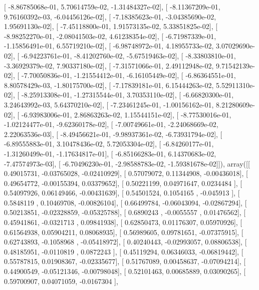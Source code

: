 \documentclass{article}
\begin{document}
       [ -8.86785068e-01,   5.70614759e-02,  -1.31484327e-02],
       [ -8.11367209e-01,   9.76160392e-03,  -6.04456126e-02],
       [ -7.18385623e-01,  -3.04385690e-02,   1.95691130e-02],
       [ -7.45118800e-01,   1.91573135e-02,   5.33851825e-02],
       [ -8.98252270e-01,  -2.08041503e-02,   4.61238354e-02],
       [ -6.71987339e-01,  -1.15856491e-01,   6.55719210e-02],
       [ -6.98748972e-01,   4.18955733e-02,   3.07029690e-02],
       [ -6.94223761e-01,  -8.41202760e-02,  -5.67519463e-02],
       [ -8.33803810e-01,  -3.36929379e-02,   7.90337180e-02],
       [ -7.31571066e-01,   2.49112948e-02,   9.71542139e-02],
       [ -7.70050836e-01,  -1.21554412e-01,  -6.16105449e-02],
       [ -6.86364551e-01,   8.80578429e-03,  -1.80175700e-02],
       [ -7.17839181e-01,   6.15444263e-02,   5.52911310e-02],
       [ -8.25913308e-01,  -1.27315544e-01,   3.70353110e-02],
       [ -6.66820300e-01,   3.24643992e-03,   5.64370210e-02],
       [ -7.23461245e-01,  -1.00156162e-01,   8.21280609e-02],
       [ -6.93983006e-01,   2.86863263e-02,   1.15544151e-02],
       [ -8.77530016e-01,  -1.02124477e-01,  -9.62360178e-02],
       [ -7.00749661e-01,  -2.24068669e-02,   2.22063536e-03],
       [ -8.49456621e-01,  -9.98937361e-02,  -6.73931794e-02],
       [ -6.89555883e-01,   3.10478436e-02,   5.72053304e-02],
       [ -6.84260177e-01,  -1.31260499e-01,  -1.17634817e-01],
       [ -6.85166283e-01,   6.14370683e-02,  -7.47574973e-03],
       [ -6.70496230e-01,  -2.98588783e-02,  -1.59381678e-02]]), array([[ 0.49015731, -0.03765028, -0.02410929],
       [ 0.57079072,  0.11344908, -0.00436018],
       [ 0.49654772, -0.00155394,  0.03379652],
       [ 0.50221199,  0.04971647,  0.0234484 ],
       [ 0.54097926,  0.06149466, -0.00431639],
       [ 0.54501524,  0.1054165 , -0.045913  ],
       [ 0.5848119 ,  0.10469708, -0.00826104],
       [ 0.66499784, -0.06043094, -0.02867294],
       [ 0.50213851, -0.02328859, -0.05325788],
       [ 0.6890243 , -0.0055557 ,  0.01476562],
       [ 0.45941861, -0.0321713 ,  0.09841938],
       [ 0.62850473,  0.01176307,  0.05970926],
       [ 0.61564938,  0.05904211,  0.08068935],
       [ 0.56989605,  0.09781651, -0.07375915],
       [ 0.62743893, -0.1058968 , -0.05418972],
       [ 0.40240443, -0.02993057,  0.08806538],
       [ 0.48185951, -0.0110819 ,  0.0872243 ],
       [ 0.45119294,  0.06346033, -0.06819442],
       [ 0.55787815,  0.01908367, -0.02335677],
       [ 0.51767089,  0.00458637, -0.07094214],
       [ 0.44900549, -0.05121346, -0.00798048],
       [ 0.52101463,  0.00685889,  0.03090265],
       [ 0.59700907,  0.04071059, -0.0167304 ],
\end{document}
